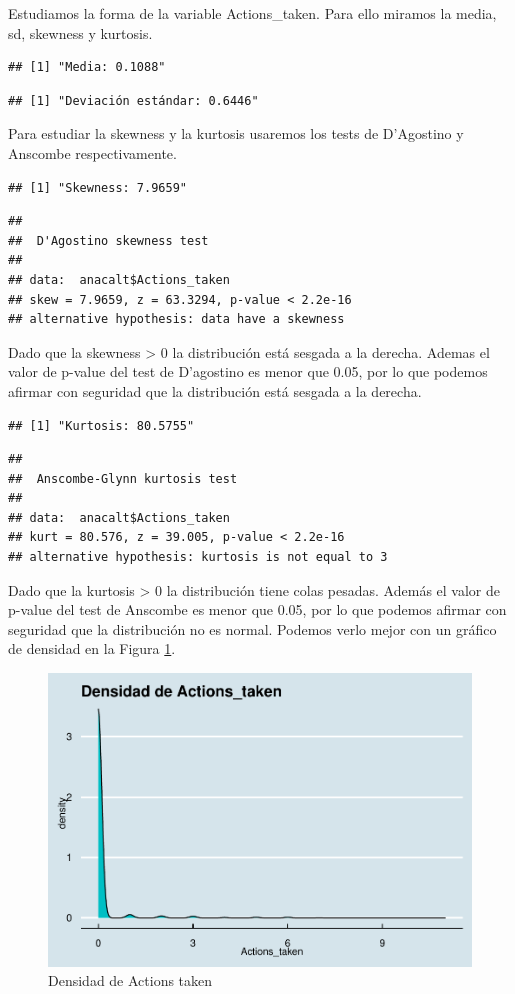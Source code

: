 \documentclass[
]{article}
\begin{document}
Estudiamos la forma de la variable Actions\_taken. Para ello miramos la
media, sd, skewness y kurtosis.

\begin{verbatim}
## [1] "Media: 0.1088"
\end{verbatim}

\begin{verbatim}
## [1] "Deviación estándar: 0.6446"
\end{verbatim}

Para estudiar la skewness y la kurtosis usaremos los tests de D'Agostino
y Anscombe respectivamente.

\begin{verbatim}
## [1] "Skewness: 7.9659"
\end{verbatim}

\begin{verbatim}
## 
##  D'Agostino skewness test
## 
## data:  anacalt$Actions_taken
## skew = 7.9659, z = 63.3294, p-value < 2.2e-16
## alternative hypothesis: data have a skewness
\end{verbatim}

Dado que la skewness \textgreater{} 0 la distribución está sesgada a la
derecha. Ademas el valor de p-value del test de D'agostino es menor que
0.05, por lo que podemos afirmar con seguridad que la distribución está
sesgada a la derecha.

\begin{verbatim}
## [1] "Kurtosis: 80.5755"
\end{verbatim}

\begin{verbatim}
## 
##  Anscombe-Glynn kurtosis test
## 
## data:  anacalt$Actions_taken
## kurt = 80.576, z = 39.005, p-value < 2.2e-16
## alternative hypothesis: kurtosis is not equal to 3
\end{verbatim}

Dado que la kurtosis \textgreater{} 0 la distribución tiene colas
pesadas. Además el valor de p-value del test de Anscombe es menor que
0.05, por lo que podemos afirmar con seguridad que la distribución no es
normal. Podemos verlo mejor con un gráfico de densidad en la Figura
\ref{fig:densidad_at}.

\begin{figure}

{\centering \includegraphics[width=0.5\linewidth]{anacalt-regresion_files/figure-latex/densidad_at-1} 

}

\caption{Densidad de Actions taken}\label{fig:densidad_at}
\end{figure}
\end{document}
